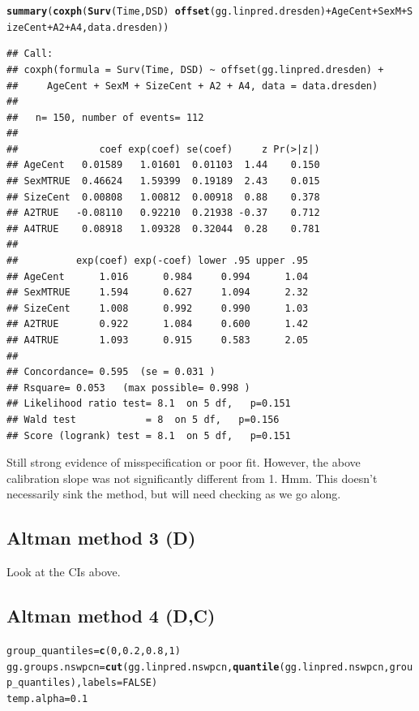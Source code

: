 \documentclass{article}\usepackage[]{graphicx}\usepackage[]{color}
\makeatletter
\newcommand{\hlnum}[1]{\textcolor[rgb]{0.686,0.059,0.569}{#1}}%
\newcommand{\hlopt}[1]{\textcolor[rgb]{0,0,0}{#1}}%
\newcommand{\hlstd}[1]{\textcolor[rgb]{0.345,0.345,0.345}{#1}}%
\newcommand{\hlkwb}[1]{\textcolor[rgb]{0.69,0.353,0.396}{#1}}%
\newcommand{\hlkwc}[1]{\textcolor[rgb]{0.333,0.667,0.333}{#1}}%
\newcommand{\hlkwd}[1]{\textcolor[rgb]{0.737,0.353,0.396}{\textbf{#1}}}%
\newenvironment{kframe}{%
 \def\at@end@of@kframe{}%
 \ifinner\ifhmode%
  \def\at@end@of@kframe{\end{minipage}}%
  \begin{minipage}{\columnwidth}%
 \fi\fi%
 \def\FrameCommand##1{\hskip\@totalleftmargin \hskip-\fboxsep
 \colorbox{shadecolor}{##1}\hskip-\fboxsep
     \hskip-\linewidth \hskip-\@totalleftmargin \hskip\columnwidth}%
 \MakeFramed {\advance\hsize-\width
   \@totalleftmargin\z@ \linewidth\hsize
   \@setminipage}}%
 {\par\unskip\endMakeFramed%
 \at@end@of@kframe}
\newenvironment{knitrout}{}{} %
\makeatother
\begin{document}
\begin{knitrout}
\begin{kframe}
{\ttfamily\noindent\bfseries\color{errorcolor}{\#\# Error in fitter(X, Y, strats, offset, init, control, weights = weights, : NA/NaN/Inf in foreign function call (arg 6)}}\begin{alltt}
\hlkwd{summary}\hlstd{(}\hlkwd{coxph}\hlstd{(}\hlkwd{Surv}\hlstd{(Time, DSD)} \hlopt{~} \hlkwd{offset}\hlstd{(gg.linpred.dresden)} \hlopt{+} \hlstd{AgeCent} \hlopt{+} \hlstd{SexM} \hlopt{+} \hlstd{SizeCent} \hlopt{+} \hlstd{A2} \hlopt{+} \hlstd{A4, data.dresden))}
\end{alltt}
\begin{verbatim}
## Call:
## coxph(formula = Surv(Time, DSD) ~ offset(gg.linpred.dresden) + 
##     AgeCent + SexM + SizeCent + A2 + A4, data = data.dresden)
## 
##   n= 150, number of events= 112 
## 
##              coef exp(coef) se(coef)     z Pr(>|z|)
## AgeCent   0.01589   1.01601  0.01103  1.44    0.150
## SexMTRUE  0.46624   1.59399  0.19189  2.43    0.015
## SizeCent  0.00808   1.00812  0.00918  0.88    0.378
## A2TRUE   -0.08110   0.92210  0.21938 -0.37    0.712
## A4TRUE    0.08918   1.09328  0.32044  0.28    0.781
## 
##          exp(coef) exp(-coef) lower .95 upper .95
## AgeCent      1.016      0.984     0.994      1.04
## SexMTRUE     1.594      0.627     1.094      2.32
## SizeCent     1.008      0.992     0.990      1.03
## A2TRUE       0.922      1.084     0.600      1.42
## A4TRUE       1.093      0.915     0.583      2.05
## 
## Concordance= 0.595  (se = 0.031 )
## Rsquare= 0.053   (max possible= 0.998 )
## Likelihood ratio test= 8.1  on 5 df,   p=0.151
## Wald test            = 8  on 5 df,   p=0.156
## Score (logrank) test = 8.1  on 5 df,   p=0.151
\end{verbatim}
\end{kframe}
\end{knitrout}
Still strong evidence of misspecification or poor fit.  However, the above calibration slope was not significantly different from 1.  Hmm.  This doesn't necessarily sink the method, but will need checking as we go along.

\subsection{Altman method 3 (D)}
Look at the CIs above.

\subsection{Altman method 4 (D,C)}
\begin{knitrout}
\color{fgcolor}\begin{kframe}
\begin{alltt}
\hlstd{group_quantiles} \hlkwb{=} \hlkwd{c}\hlstd{(}\hlnum{0}\hlstd{,} \hlnum{0.2}\hlstd{,} \hlnum{0.8}\hlstd{,} \hlnum{1}\hlstd{)}
\hlstd{gg.groups.nswpcn} \hlkwb{=} \hlkwd{cut}\hlstd{(gg.linpred.nswpcn,} \hlkwd{quantile}\hlstd{(gg.linpred.nswpcn, group_quantiles),} \hlkwc{labels} \hlstd{=} \hlnum{FALSE}\hlstd{)}
\hlstd{temp.alpha} \hlkwb{=} \hlnum{0.1}
\end{alltt}
\end{kframe}
\end{knitrout}
\end{document}
